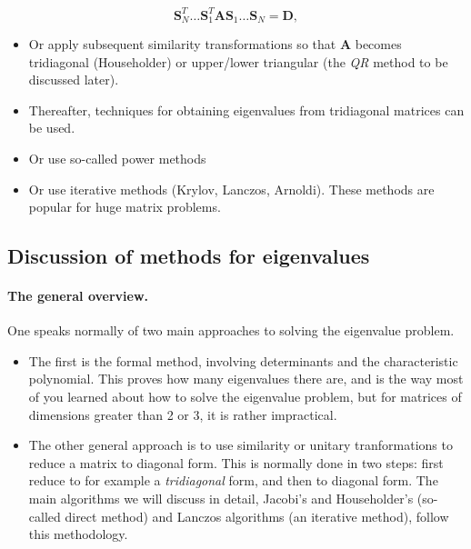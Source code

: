 \documentclass[%
oneside,                 %
final,                   %
10pt]{article}
\begin{document}
\noindent
\begin{equation}
   \mathbf{S}_N^T\dots \mathbf{S}_1^T\mathbf{A}\mathbf{S}_1\dots \mathbf{S}_N=\mathbf{D} ,
\end{equation}
\begin{itemize}
 \item Or apply subsequent similarity transformations so that $\mathbf{A}$ becomes tridiagonal (Householder) or upper/lower triangular (the \emph{QR} method to be discussed later). 

 \item Thereafter, techniques for obtaining eigenvalues from tridiagonal matrices can be used.

 \item Or use so-called power methods

 \item Or use iterative methods (Krylov, Lanczos, Arnoldi). These methods are popular for huge matrix problems.
\end{itemize}

\noindent



\subsection*{Discussion of  methods for eigenvalues}

\paragraph{The general overview.}

One speaks normally of two main approaches to solving the eigenvalue problem.
\begin{itemize}
 \item The first is the formal method, involving determinants and the  characteristic polynomial. This proves how many eigenvalues  there are, and is the way most of you learned about how to solve the eigenvalue problem, but for matrices of dimensions greater than 2 or 3, it is rather impractical.

 \item The other general approach is to use similarity or unitary tranformations  to reduce a matrix to diagonal form. This is normally done in two steps: first reduce to for example a \emph{tridiagonal} form, and then to diagonal form. The main algorithms we will discuss in detail, Jacobi's and  Householder's  (so-called direct method) and Lanczos algorithms (an iterative method), follow this methodology. 
\end{itemize}
\end{document}
